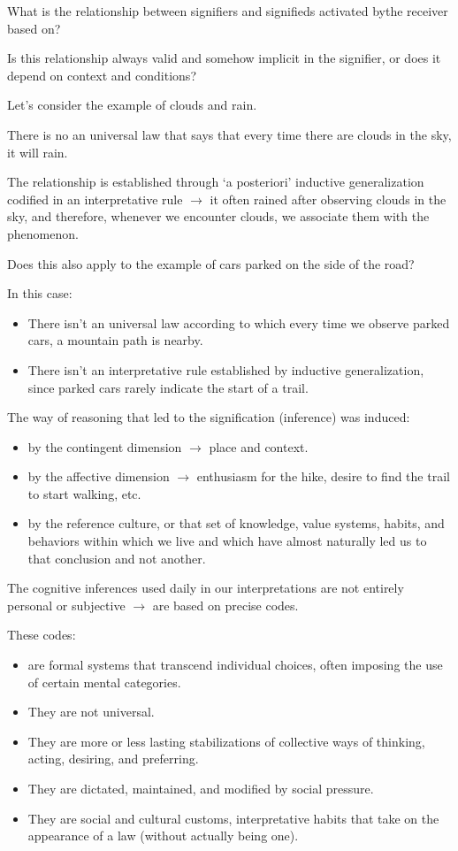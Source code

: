 What is the relationship between signifiers and signifieds activated bythe receiver based  on?

Is this relationship always valid and somehow implicit in the signifier, or does it depend on context and conditions?

Let's consider the example of clouds and rain.

There is no an universal law that says that every time there are clouds in the sky, it will rain.

The relationship is established through `a posteriori' inductive generalization codified in an interpretative rule \(\rightarrow\) it often rained after observing clouds in the sky, and therefore, whenever we encounter clouds, we associate them with the phenomenon.

Does this also apply to the example of cars parked on the side of the road?

In this case:

\begin{itemize}
\tightlist
\item There isn't an universal law according to which every time we observe parked cars, a mountain path is nearby.
\item There isn't an interpretative rule established by inductive generalization, since parked cars rarely indicate the start of a trail.
\end{itemize}

The way of reasoning that led to the signification (inference) was induced:

\begin{itemize}
\tightlist
\item by the contingent dimension \(\rightarrow\) place and context.
\item by the affective dimension \(\rightarrow\) enthusiasm for the hike, desire to find the trail to start walking, etc.
\item by the reference culture, or that set of knowledge, value systems, habits, and behaviors within which we live and which have almost naturally led us to that conclusion and not another.
\end{itemize}

The cognitive inferences used daily in our interpretations are not entirely personal or subjective \(\rightarrow\) are based on precise codes.

These codes:

\begin{itemize}
\tightlist
\item are formal systems that transcend individual choices, often imposing the use of certain mental categories.
\item They are not universal.
\item They are more or less lasting stabilizations of collective ways of thinking, acting, desiring, and preferring.
\item They are dictated, maintained, and modified by social pressure.
\item They are social and cultural customs, interpretative habits that take on the appearance of a law (without actually being one).
\end{itemize}

